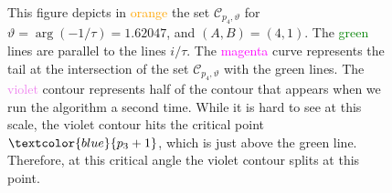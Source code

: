 \documentclass[12pt,reqno]{amsart}
\theoremstyle{definition}
\def\calC{\mathcal C}
\renewcommand{\=}{\;=\;}
\begin{document}
\begin{figure}[ht]
\begin{tiny}
\end{tiny}
\caption{This figure depicts in \textcolor{orange}{orange} the set $\calC_{p_4,\vartheta}$ for $\vartheta=\arg(-1/\tau)=1.62047$, and $(A,B)=(4,1)$. The \textcolor{green}{green} lines are parallel to the lines $i/\tau$. The \textcolor{magenta}{magenta} curve represents the tail at the intersection of the set $\calC_{p_4,\vartheta}$ with the green lines. The \textcolor{violet}{violet} contour represents half of the contour that appears when we run the algorithm a second time. While it is hard to see at this scale, the violet contour hits the critical point $\textcolor{blue}{p_3+1}$, which is just above the green line. Therefore, at this critical angle the violet contour splits at this point.}
\label{fig:saddle.A4B1.III-IV}
\end{figure}
\end{document}
